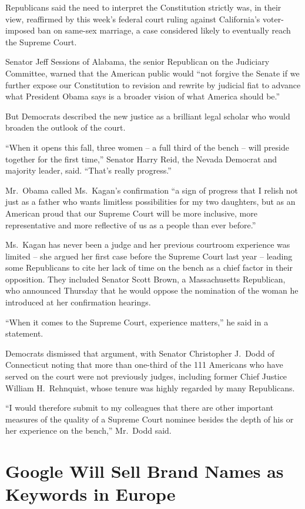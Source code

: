 ﻿\documentclass[12pt]{article}
\begin{document}
Republicans said the need to interpret the Constitution strictly was, in their view, reaffirmed by
this week's federal court ruling against California's voter-imposed ban on same-sex marriage, a case
considered likely to eventually reach the Supreme Court.

Senator Jeff Sessions of Alabama, the senior Republican on the Judiciary Committee, warned that the
American public would ``not forgive the Senate if we further expose our Constitution to revision and
rewrite by judicial fiat to advance what President Obama says is a broader vision of what America
should be.''

But Democrats described the new justice as a brilliant legal scholar who would broaden the outlook
of the court.

``When it opens this fall, three women -- a full third of the bench -- will preside together for the
first time,'' Senator Harry Reid, the Nevada Democrat and majority leader, said. ``That's really
progress.''

Mr.~Obama called Ms.~Kagan's confirmation ``a sign of progress that I relish not just as a father
who wants limitless possibilities for my two daughters, but as an American proud that our Supreme
Court will be more inclusive, more representative and more reflective of us as a people than ever
before.''

Ms.~Kagan has never been a judge and her previous courtroom experience was limited -- she argued her
first case before the Supreme Court last year -- leading some Republicans to cite her lack of time
on the bench as a chief factor in their opposition. They included Senator Scott Brown, a
Massachusetts Republican, who announced Thursday that he would oppose the nomination of the woman he
introduced at her confirmation hearings.

``When it comes to the Supreme Court, experience matters,'' he said in a statement.

Democrats dismissed that argument, with Senator Christopher J.~Dodd of Connecticut noting that more
than one-third of the 111 Americans who have served on the court were not previously judges,
including former Chief Justice William H.~Rehnquist, whose tenure was highly regarded by many
Republicans.

``I would therefore submit to my colleagues that there are other important measures of the quality
of a Supreme Court nominee besides the depth of his or her experience on the bench,'' Mr.~Dodd said.

\section{Google Will Sell Brand Names as Keywords in Europe}
\end{document}
